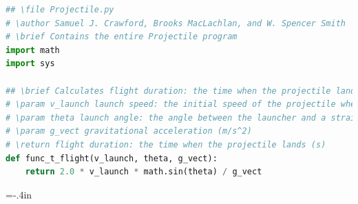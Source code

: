 \documentclass[usenames,dvipsnames,10pt]{beamer}
\begin{document}
\begin{frame}[fragile]

\begin{lstlisting}[language=Python,basicstyle=\ttfamily\tiny,
  keywordstyle=bfseries,breaklines=false]
## \file Projectile.py
# \author Samuel J. Crawford, Brooks MacLachlan, and W. Spencer Smith
# \brief Contains the entire Projectile program
import math
import sys

## \brief Calculates flight duration: the time when the projectile lands (s)
# \param v_launch launch speed: the initial speed of the projectile when launched (m/s)
# \param theta launch angle: the angle between the launcher and a straight line from the launcher to the target (rad)
# \param g_vect gravitational acceleration (m/s^2)
# \return flight duration: the time when the projectile lands (s)
def func_t_flight(v_launch, theta, g_vect):
    return 2.0 * v_launch * math.sin(theta) / g_vect

\end{lstlisting}
\end{frame}
  
\hoffset=-.4in %
\begin{frame}[plain] %

  
\end{frame}
\hoffset=0in %
\end{document}
